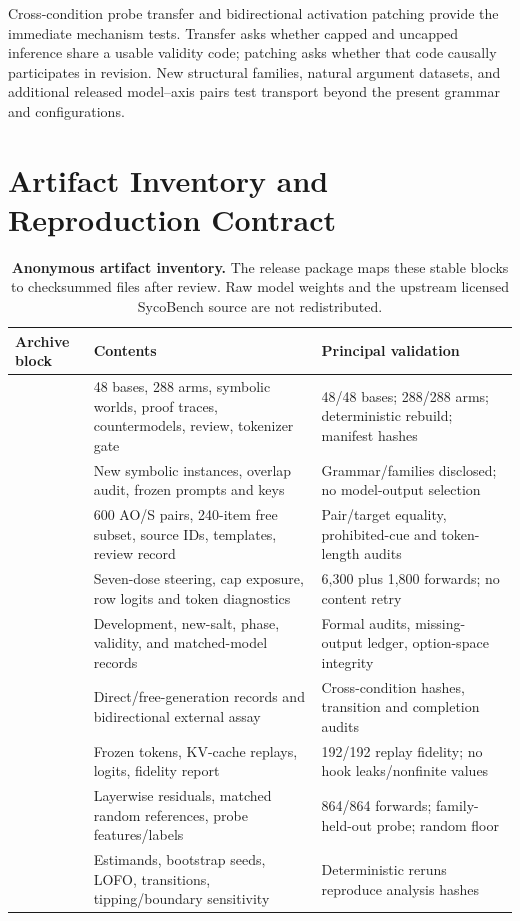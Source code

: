\documentclass[letterpaper]{article}
\begin{document}
Cross-condition probe transfer and bidirectional activation patching provide the immediate mechanism tests.  Transfer asks whether capped and uncapped inference share a usable validity code; patching asks whether that code causally participates in revision.  New structural families, natural argument datasets, and additional released model--axis pairs test transport beyond the present grammar and configurations.

\section{Artifact Inventory and Reproduction Contract}
\label{supp:reproducibility}

\begin{table}[t]
\centering
\scriptsize
\setlength{\tabcolsep}{3pt}
\renewcommand{\arraystretch}{1.12}
\begin{tabularx}{\textwidth}{@{}L{3.2cm}YY@{}}
\toprule
Archive block & Contents & Principal validation \\
\midrule
{} & 48 bases, 288 arms, symbolic worlds, proof traces, countermodels, review, tokenizer gate & 48/48 bases; 288/288 arms; deterministic rebuild; manifest hashes \\
 & New symbolic instances, overlap audit, frozen prompts and keys & Grammar/families disclosed; no model-output selection \\
 & 600 AO/S pairs, 240-item free subset, source IDs, templates, review record & Pair/target equality, prohibited-cue and token-length audits \\
 & Seven-dose steering, cap exposure, row logits and token diagnostics & 6,300 plus 1,800 forwards; no content retry \\
 & Development, new-salt, phase, validity, and matched-model records & Formal audits, missing-output ledger, option-space integrity \\
 & Direct/free-generation records and bidirectional external assay & Cross-condition hashes, transition and completion audits \\
 & Frozen tokens, KV-cache replays, logits, fidelity report & 192/192 replay fidelity; no hook leaks/nonfinite values \\
 & Layerwise residuals, matched random references, probe features/labels & 864/864 forwards; family-held-out probe; random floor \\
 & Estimands, bootstrap seeds, LOFO, transitions, tipping/boundary sensitivity & Deterministic reruns reproduce analysis hashes \\
\bottomrule
\end{tabularx}
\caption{\textbf{Anonymous artifact inventory.} The release package maps these stable blocks to checksummed files after review.  Raw model weights and the upstream licensed SycoBench source are not redistributed.}
\label{tab:supp-artifacts}
\end{table}
\end{document}
